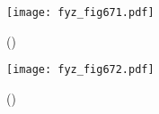 {    \begin{figure}[ht!] %
      \centering
      \texttt{[image: fyz\_fig671.pdf]}
      \caption{
               (\cite[s.~707]{Feynman02})}
      \label{fyz_fig671}
    \end{figure}

    \begin{figure}[ht!] %
      \centering
      \texttt{[image: fyz\_fig672.pdf]}
      \caption{
               (\cite[s.~707]{Feynman02})}
      \label{fyz_fig672}
    \end{figure}

} %
